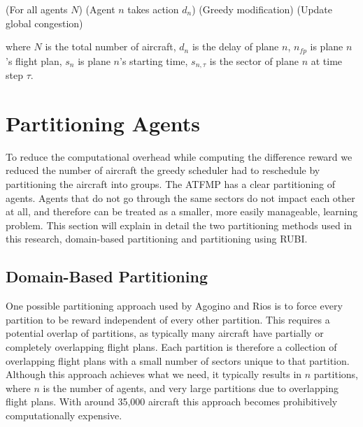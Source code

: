 \documentclass[onehalf,11pt]{beavtex}
\begin{document}
\begin{algorithm}
  \caption{Greedy Scheduler}
  \begin{algorithmic}[1]
    \Statex
	   \hspace{23 mm} (For all agents $N$)
	     \hspace{20 mm} (Agent $n$ takes action $d_n$)
           \hspace{24 mm}(Greedy modification)
        \EndWhile
         \hspace{15 mm}(Update global congestion)
        \EndFor
      \EndFor
    \EndFunction
  \end{algorithmic}
\end{algorithm}

where $N$ is the total number of aircraft, $d_n$ is the delay of plane $n$, $n_{fp}$ is plane $n$'s flight plan, $s_n$ is plane $n$'s starting time, $s_{n, \tau}$ is the sector of plane $n$ at time step $\tau$.

\chapter{Partitioning Agents}

To reduce the computational overhead while computing the difference reward we reduced the number of aircraft the greedy scheduler had to reschedule by partitioning the aircraft into groups. The ATFMP has a clear partitioning of agents. Agents that do not go through the same sectors do not impact each other at all, and therefore can be treated as a smaller, more easily manageable, learning problem. This section will explain in detail the two partitioning methods used in this research, domain-based partitioning and partitioning using RUBI.

\section{Domain-Based Partitioning}

One possible partitioning approach used by Agogino and Rios \cite{6095996} is to force every partition to be reward independent of every other partition. This requires a potential overlap of partitions, as typically many aircraft have partially or completely overlapping flight plans. Each partition is therefore a collection of overlapping flight plans with a small number of sectors unique to that partition. Although this approach achieves what we need, it typically results in $n$ partitions, where $n$ is the number of agents, and very large partitions due to overlapping flight plans. With around 35,000 aircraft this approach becomes prohibitively computationally expensive.
\end{document}
